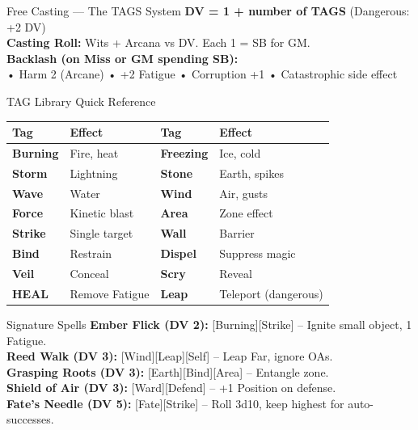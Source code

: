 \documentclass[10pt]{article}
\begin{document}
\begin{minipage}[t]{0.48\linewidth}
    \vspace{0.5em}
    
    \begin{charbox}{Free Casting --- The TAGS System}
        \textbf{DV = 1 + number of TAGS} (Dangerous: +2 DV)\\
        \textbf{Casting Roll:} Wits + Arcana vs DV. Each 1 = SB for GM.\\
        \textbf{Backlash (on Miss or GM spending SB):}\\
        • Harm 2 (Arcane) • +2 Fatigue • Corruption +1 • Catastrophic side effect
    \end{charbox}
\end{minipage}
\hfill
\begin{minipage}[t]{0.48\linewidth}
    \begin{charbox}{TAG Library Quick Reference}
        \begin{tabular}{>{\bfseries}p{2cm} p{2.5cm} >{\bfseries}p{2cm} p{2.5cm}}
            \toprule
            \textbf{Tag} & \textbf{Effect} & \textbf{Tag} & \textbf{Effect} \\
            \midrule
            Burning & Fire, heat & Freezing & Ice, cold \\
            Storm & Lightning & Stone & Earth, spikes \\
            Wave & Water & Wind & Air, gusts \\
            Force & Kinetic blast & Area & Zone effect \\
            Strike & Single target & Wall & Barrier \\
            Bind & Restrain & Dispel & Suppress magic \\
            Veil & Conceal & Scry & Reveal \\
            HEAL & Remove Fatigue & Leap & Teleport (dangerous) \\
            \bottomrule
        \end{tabular}
    \end{charbox}
    
    \vspace{0.5em}
    
    \begin{charbox}{Signature Spells}
        \textbf{Ember Flick (DV 2):} [Burning][Strike] -- Ignite small object, 1 Fatigue.\\
        \textbf{Reed Walk (DV 3):} [Wind][Leap][Self] -- Leap Far, ignore OAs.\\
        \textbf{Grasping Roots (DV 3):} [Earth][Bind][Area] -- Entangle zone.\\
        \textbf{Shield of Air (DV 3):} [Ward][Defend] -- +1 Position on defense.\\
        \textbf{Fate's Needle (DV 5):} [Fate][Strike] -- Roll 3d10, keep highest for auto-successes.
    \end{charbox}
\end{minipage}
\end{document}
